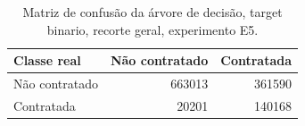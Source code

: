 \begin{table}
\caption{Matriz de confusão da árvore de decisão, target binario, recorte geral, experimento E5.}
\label{tab:matriz_confusao_treeClassification_binario_recorte_geral_in_sample_e5}
\begin{tabular}{lrr}
\toprule
Classe real & Não contratado & Contratada \\
\midrule
Não contratado & 663013 & 361590 \\
Contratada & 20201 & 140168 \\
\bottomrule
\end{tabular}
\end{table}
